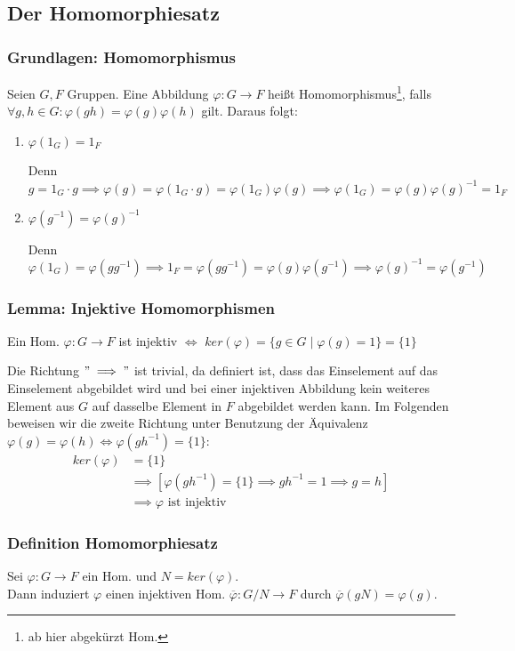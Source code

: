 \documentclass[12pt, german]{article}
\begin{document}
	\subsection{Der Homomorphiesatz}		
	\subsubsection{Grundlagen: Homomorphismus}
	Seien $G,F$ Gruppen. 
	Eine Abbildung $\varphi: G \to F$ hei\ss t Homomorphismus\footnote{ab hier abgekürzt Hom.}, falls $\forall g,h \in G : \varphi(gh) = \varphi(g)\varphi(h)$ gilt. Daraus folgt:\\
	\begin{enumerate}[label=\roman*)]
		\item $\varphi(1_G) = 1_F$ ~\par
		Denn $g=1_G\cdot g \implies \varphi(g)=\varphi(1_G\cdot g)=\varphi(1_G)\varphi(g) \implies \varphi(1_G) = \varphi(g) \varphi(g)^{-1} = 1_F$
		
		\item $\varphi(g^{-1})=\varphi(g)^{-1}$ ~\par
		Denn $\varphi(1_G)=\varphi(gg^{-1}) \implies 1_F =\varphi(gg^{-1})= \varphi(g)\varphi(g^{-1}) \implies \varphi(g)^{-1} = \varphi(g^{-1})$
	\end{enumerate}
	
	\subsubsection{Lemma: Injektive Homomorphismen}
	Ein Hom. $\varphi: G \to F$ ist injektiv $\iff$ $ker(\varphi) = \{g \in G \mid \varphi(g)= 1\} = \{1\}$ 
	
	Die Richtung $"\implies "$ ist trivial, da definiert ist, dass das Einselement auf das Einselement abgebildet wird und bei einer injektiven Abbildung kein weiteres Element aus $G$ auf dasselbe Element in $F$ abgebildet werden kann.
	Im Folgenden beweisen wir die zweite Richtung unter Benutzung der Äquivalenz $\varphi(g) = \varphi(h) \iff \varphi(gh^{-1}) = \{1\} $:
	\begin{align*}
		ker(\varphi) &= \{1\} \\
		&\implies [\varphi(gh^{-1}) = \{1\} \implies gh^{-1} = 1 \implies g = h] \\ 
		&\implies \varphi \text{ ist injektiv}
	\end{align*}
	
	\subsubsection{Definition Homomorphiesatz}
	Sei $\varphi: G \to F$ ein Hom.  und $N = ker(\varphi)$. \\
	Dann induziert $\varphi$ einen injektiven Hom. $\overline{\varphi} : G/N \to F$ durch $\overline{\varphi}(gN) = \varphi(g)$.
	\newline
	
\end{document}
